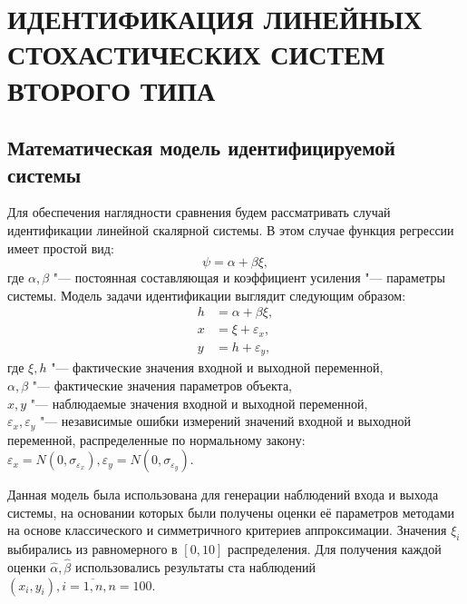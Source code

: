 \chapter[Идентификация линейных стохастических систем второго типа]{%
  ИДЕНТИФИКАЦИЯ ЛИНЕЙНЫХ СТОХАСТИЧЕСКИХ
  СИСТЕМ ВТОРОГО ТИПА
}

\section{Математическая модель идентифицируемой системы}

Для обеспечения наглядности сравнения будем рассматривать случай
идентификации линейной скалярной системы.
В этом случае функция регрессии имеет простой вид:
\begin{equation}
  \psi = \alpha + \beta \xi,
  \label{eq:linear_fun_scalar}
\end{equation}
где \( \alpha, \beta \) "--- постоянная составляющая и коэффициент усиления "---
параметры системы. Модель задачи идентификации выглядит следующим образом:
\begin{equation}
  \label{eq:linear_model_scalar}
  \begin{aligned}
  h &= \alpha + \beta \xi, \\
  x &= \xi + \varepsilon_x, \\
  y &= h + \varepsilon_y,
  \end{aligned}
\end{equation}
где \( \xi, h \) "--- фактические значения входной и выходной переменной, \\
\hspace*{6mm} \( \alpha, \beta \) "--- фактические значения параметров объекта, \\
\hspace*{6mm} \( x, y \) "--- наблюдаемые значения входной и выходной переменной, \\
\hspace*{5mm} \( \varepsilon_x, \varepsilon_y \) "--- независимые ошибки измерений значений
входной и выходной переменной, распределенные по нормальному закону:
\(
\varepsilon_x = N(0, \sigma_{\varepsilon_x}),
\varepsilon_y = N(0, \sigma_{\varepsilon_y})
\).

Данная модель была использована для генерации наблюдений входа и выхода системы,
на основании которых были получены оценки её параметров методами на основе
классического и симметричного критериев аппроксимации.
Значения \( \xi_i \) выбирались из равномерного в \( [0, 10] \) распределения.
Для получения каждой оценки \( \hat{\alpha}, \hat{\beta} \) использовались результаты
ста наблюдений \( ( x_i, y_i ), i = \overline{1, n}, n = 100 \).

